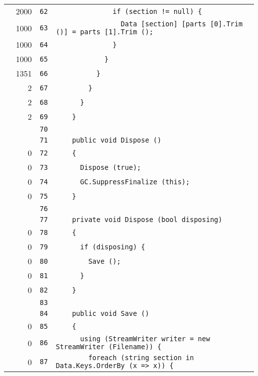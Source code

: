 \documentclass[a4paper,10pt]{article}
\begin{document}
\begin{longtable}[l]{lrrl}
\cellcolor{green} & 2000 & \verb~62~ & \verb~              if (section != null) {~\\
\cellcolor{green} & 1000 & \verb~63~ & \verb~                Data [section] [parts [0].Trim ()] = parts [1].Trim ();~\\
\cellcolor{green} & 1000 & \verb~64~ & \verb~              }~\\
\cellcolor{green} & 1000 & \verb~65~ & \verb~            }~\\
\cellcolor{green} & 1351 & \verb~66~ & \verb~          }~\\
\cellcolor{green} & 2 & \verb~67~ & \verb~        }~\\
\cellcolor{green} & 2 & \verb~68~ & \verb~      }~\\
\cellcolor{green} & 2 & \verb~69~ & \verb~    }~\\
\cellcolor{gray} &  & \verb~70~ & \verb~~\\
\cellcolor{gray} &  & \verb~71~ & \verb~    public void Dispose ()~\\
\cellcolor{red} & 0 & \verb~72~ & \verb~    {~\\
\cellcolor{red} & 0 & \verb~73~ & \verb~      Dispose (true);~\\
\cellcolor{red} & 0 & \verb~74~ & \verb~      GC.SuppressFinalize (this);~\\
\cellcolor{red} & 0 & \verb~75~ & \verb~    }~\\
\cellcolor{gray} &  & \verb~76~ & \verb~~\\
\cellcolor{gray} &  & \verb~77~ & \verb~    private void Dispose (bool disposing)~\\
\cellcolor{red} & 0 & \verb~78~ & \verb~    {~\\
\cellcolor{red} & 0 & \verb~79~ & \verb~      if (disposing) {~\\
\cellcolor{red} & 0 & \verb~80~ & \verb~        Save ();~\\
\cellcolor{red} & 0 & \verb~81~ & \verb~      }~\\
\cellcolor{red} & 0 & \verb~82~ & \verb~    }~\\
\cellcolor{gray} &  & \verb~83~ & \verb~~\\
\cellcolor{gray} &  & \verb~84~ & \verb~    public void Save ()~\\
\cellcolor{red} & 0 & \verb~85~ & \verb~    {~\\
\cellcolor{red} & 0 & \verb~86~ & \verb~      using (StreamWriter writer = new StreamWriter (Filename)) {~\\
\cellcolor{red} & 0 & \verb~87~ & \verb~        foreach (string section in Data.Keys.OrderBy (x => x)) {~\\

\end{longtable}
\end{document}
